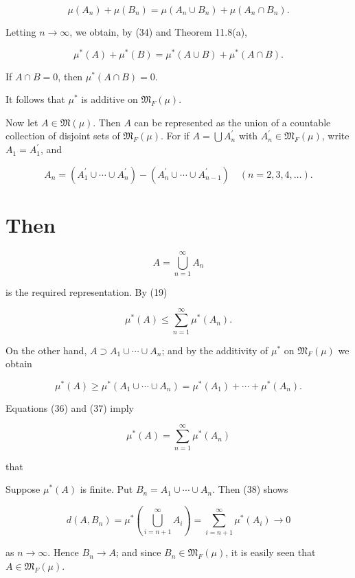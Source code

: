 \documentclass[10pt]{article}
\begin{document}
$$
\mu\left(A_{n}\right)+\mu\left(B_{n}\right)=\mu\left(A_{n} \cup B_{n}\right)+\mu\left(A_{n} \cap B_{n}\right) .
$$

Letting $n \rightarrow \infty$, we obtain, by (34) and Theorem 11.8(a),

$$
\mu^{*}(A)+\mu^{*}(B)=\mu^{*}(A \cup B)+\mu^{*}(A \cap B) .
$$

If $A \cap B=0$, then $\mu^{*}(A \cap B)=0$.

It follows that $\mu^{*}$ is additive on $\mathfrak{M}_{F}(\mu)$.

Now let $A \in \mathfrak{M}(\mu)$. Then $A$ can be represented as the union of a countable collection of disjoint sets of $\mathfrak{M}_{F}(\mu)$. For if $A=\bigcup A_{n}^{\prime}$ with $A_{n}^{\prime} \in \mathfrak{M}_{F}(\mu)$, write $A_{1}=A_{1}^{\prime}$, and

$$
A_{n}=\left(A_{1}^{\prime} \cup \cdots \cup A_{n}^{\prime}\right)-\left(A_{n}^{\prime} \cup \cdots \cup A_{n-1}^{\prime}\right) \quad(n=2,3,4, \ldots) .
$$

\section{Then}
$$
A=\bigcup_{n=1}^{\infty} A_{n}
$$

is the required representation. By (19)

$$
\mu^{*}(A) \leq \sum_{n=1}^{\infty} \mu^{*}\left(A_{n}\right) .
$$

On the other hand, $A \supset A_{1} \cup \cdots \cup A_{n}$; and by the additivity of $\mu^{*}$ on $\mathfrak{M}_{F}(\mu)$ we obtain

$$
\mu^{*}(A) \geq \mu^{*}\left(A_{1} \cup \cdots \cup A_{n}\right)=\mu^{*}\left(A_{1}\right)+\cdots+\mu^{*}\left(A_{n}\right) .
$$

Equations (36) and (37) imply

$$
\mu^{*}(A)=\sum_{n=1}^{\infty} \mu^{*}\left(A_{n}\right)
$$

that

Suppose $\mu^{*}(A)$ is finite. Put $B_{n}=A_{1} \cup \cdots \cup A_{n}$. Then (38) shows

$$
d\left(A, B_{n}\right)=\mu^{*}\left(\bigcup_{i=n+1}^{\infty} A_{i}\right)=\sum_{i=n+1}^{\infty} \mu^{*}\left(A_{i}\right) \rightarrow 0
$$

as $n \rightarrow \infty$. Hence $B_{n} \rightarrow A$; and since $B_{n} \in \mathfrak{M}_{F}(\mu)$, it is easily seen that $A \in \mathfrak{M}_{F}(\mu)$.
\end{document}
